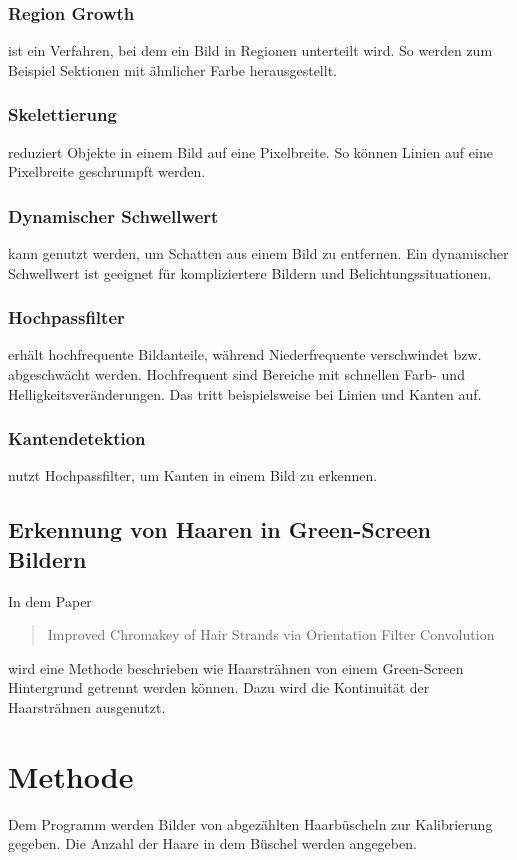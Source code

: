 \documentclass[german,a4paper,12pt]{llncs}
\begin{document}
\subsubsection{Region Growth}
ist ein Verfahren, bei dem ein Bild in Regionen unterteilt wird. So werden zum Beispiel Sektionen mit ähnlicher Farbe herausgestellt. 

\subsubsection{Skelettierung}
reduziert Objekte in einem Bild auf eine Pixelbreite. So können Linien auf eine Pixelbreite geschrumpft werden.

\subsubsection{Dynamischer Schwellwert}
kann genutzt werden, um Schatten aus einem Bild zu entfernen. Ein dynamischer Schwellwert ist geeignet für kompliziertere Bildern und Belichtungssituationen.


\subsubsection{Hochpassfilter}
erhält hochfrequente Bildanteile, während Niederfrequente verschwindet bzw. abgeschwächt werden. 
Hochfrequent sind Bereiche mit schnellen Farb- und Helligkeitsveränderungen. Das tritt beispielsweise bei Linien und Kanten auf.

\subsubsection{Kantendetektion}

nutzt Hochpassfilter, um Kanten in einem Bild zu erkennen. 

\subsection{Erkennung von Haaren in Green-Screen Bildern}

In dem Paper\blockquote{Improved Chromakey of Hair Strands via Orientation Filter Convolution} wird eine Methode beschrieben wie Haarsträhnen von einem Green-Screen Hintergrund getrennt werden können. Dazu wird die Kontinuität der Haarsträhnen ausgenutzt. \cite{GreenScreenHair}

\section{Methode}
Dem Programm werden Bilder von abgezählten Haarbüscheln zur Kalibrierung gegeben. Die Anzahl der Haare in dem Büschel werden angegeben. 
\end{document}

